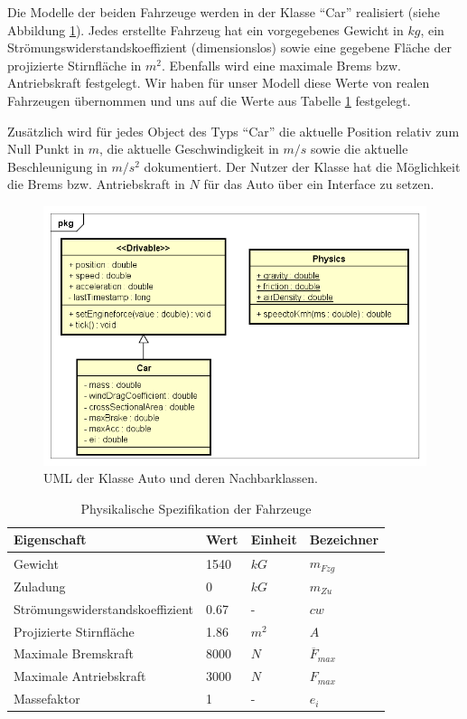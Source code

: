 \documentclass[12pt,a4paper,bibliography=totocnumbered,listof=totocnumbered, abstracton]{scrartcl}
\theoremstyle{Umgebung}
\begin{document}
Die Modelle der beiden Fahrzeuge werden in der Klasse \enquote{Car} realisiert (siehe Abbildung \ref{fig:car}). Jedes erstellte Fahrzeug hat ein vorgegebenes Gewicht in $kg$, ein Strömungswiderstandskoeffizient (dimensionslos) sowie eine gegebene Fläche der projizierte Stirnfläche in $m^2$. Ebenfalls wird eine maximale Brems bzw. Antriebskraft festgelegt. Wir haben für unser Modell diese Werte von realen Fahrzeugen übernommen und uns auf die Werte aus Tabelle \ref{table:car} festgelegt.

Zusätzlich wird für jedes Object des Typs \enquote{Car} die aktuelle Position relativ zum Null Punkt in $m$, die aktuelle Geschwindigkeit in $m/s$ sowie  die aktuelle Beschleunigung in $m/s^2$ dokumentiert. Der Nutzer der Klasse hat die Möglichkeit die Brems bzw. Antriebskraft in $N$ für das Auto über ein Interface zu setzen.

\begin{figure}
	\centering
	\includegraphics[width=0.7\linewidth]{img/practical/car-diagram}
	\caption{UML der Klasse Auto und deren Nachbarklassen.}
	\label{fig:car}
\end{figure}

\begin{table}[]
	\centering
	\caption{Physikalische Spezifikation der Fahrzeuge}
	\label{table:car}
	\begin{tabular}{@{}llll@{}}
		\toprule
		Eigenschaft                     & Wert & Einheit & Bezeichner           \\ \midrule
		Gewicht                         & 1540 & $kG$    & $m_{Fzg}$            \\
		Zuladung                        & 0    & $kG$    & $m_{Zu}$             \\
		Strömungswiderstandskoeffizient & 0.67 & -       & $cw$                 \\
		Projizierte Stirnfläche         & 1.86 & $m^2$   & $A$                  \\
		Maximale Bremskraft             & 8000 & $N$     & $\overline{F}_{max}$ \\
		Maximale Antriebskraft          & 3000 & $N$     & $ {F}_{max} $        \\
		Massefaktor                     & 1    & -       & $ {e}_{i} $          \\ \bottomrule
	\end{tabular}
\end{table}
\end{document}
